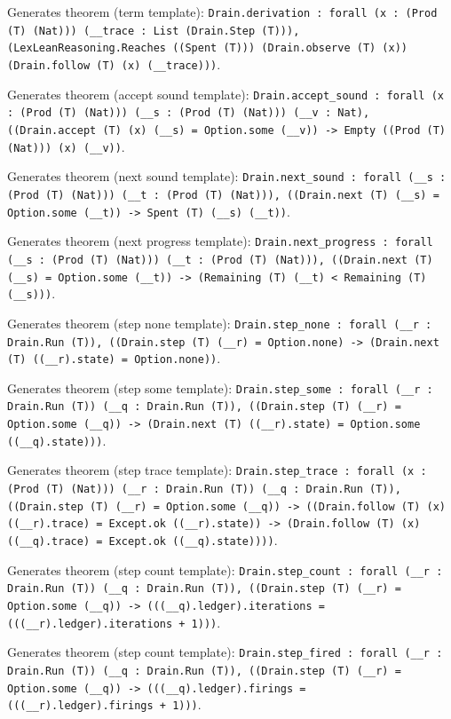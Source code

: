 \documentclass[11pt]{article}
\begin{document}
\noindent Generates theorem (term template): \texttt{Drain.derivation : forall (x : (Prod (T) (Nat))) (\_\_trace : List (Drain.Step (T))), (LexLeanReasoning.Reaches ((Spent (T))) (Drain.observe (T) (x)) (Drain.follow (T) (x) (\_\_trace)))}.\par
\noindent Generates theorem (accept sound template): \texttt{Drain.accept\_sound : forall (x : (Prod (T) (Nat))) (\_\_s : (Prod (T) (Nat))) (\_\_v : Nat), ((Drain.accept (T) (x) (\_\_s) = Option.some (\_\_v)) -> Empty ((Prod (T) (Nat))) (x) (\_\_v))}.\par
\noindent Generates theorem (next sound template): \texttt{Drain.next\_sound : forall (\_\_s : (Prod (T) (Nat))) (\_\_t : (Prod (T) (Nat))), ((Drain.next (T) (\_\_s) = Option.some (\_\_t)) -> Spent (T) (\_\_s) (\_\_t))}.\par
\noindent Generates theorem (next progress template): \texttt{Drain.next\_progress : forall (\_\_s : (Prod (T) (Nat))) (\_\_t : (Prod (T) (Nat))), ((Drain.next (T) (\_\_s) = Option.some (\_\_t)) -> (Remaining (T) (\_\_t) < Remaining (T) (\_\_s)))}.\par
\noindent Generates theorem (step none template): \texttt{Drain.step\_none : forall (\_\_r : Drain.Run (T)), ((Drain.step (T) (\_\_r) = Option.none) -> (Drain.next (T) ((\_\_r).state) = Option.none))}.\par
\noindent Generates theorem (step some template): \texttt{Drain.step\_some : forall (\_\_r : Drain.Run (T)) (\_\_q : Drain.Run (T)), ((Drain.step (T) (\_\_r) = Option.some (\_\_q)) -> (Drain.next (T) ((\_\_r).state) = Option.some ((\_\_q).state)))}.\par
\noindent Generates theorem (step trace template): \texttt{Drain.step\_trace : forall (x : (Prod (T) (Nat))) (\_\_r : Drain.Run (T)) (\_\_q : Drain.Run (T)), ((Drain.step (T) (\_\_r) = Option.some (\_\_q)) -> ((Drain.follow (T) (x) ((\_\_r).trace) = Except.ok ((\_\_r).state)) -> (Drain.follow (T) (x) ((\_\_q).trace) = Except.ok ((\_\_q).state))))}.\par
\noindent Generates theorem (step count template): \texttt{Drain.step\_count : forall (\_\_r : Drain.Run (T)) (\_\_q : Drain.Run (T)), ((Drain.step (T) (\_\_r) = Option.some (\_\_q)) -> (((\_\_q).ledger).iterations = (((\_\_r).ledger).iterations + 1)))}.\par
\noindent Generates theorem (step count template): \texttt{Drain.step\_fired : forall (\_\_r : Drain.Run (T)) (\_\_q : Drain.Run (T)), ((Drain.step (T) (\_\_r) = Option.some (\_\_q)) -> (((\_\_q).ledger).firings = (((\_\_r).ledger).firings + 1)))}.\par
\end{document}
